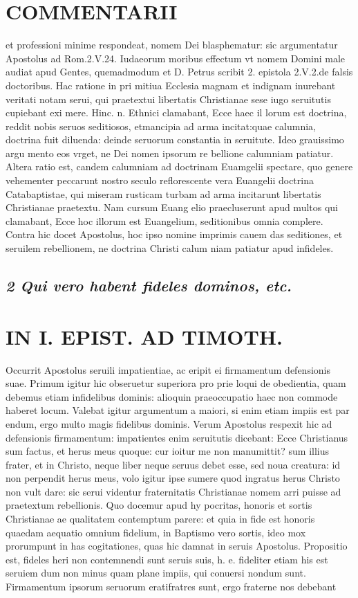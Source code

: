 \documentclass{article}
\begin{document}
\begin{pages}
\section*{COMMENTARII }
\marginpar{[ p.146 ]}\pstart et professioni minime respondeat, nomem Dei blasphematur: sic argumentatur Apostolus ad Rom.2.V.24. Iudaeorum moribus effectum vt nomem Domini male audiat apud Gentes, quemadmodum et D. Petrus scribit 2. epistola 2.V.2.de falsis doctoribus. Hac ratione in pri mitiua Ecclesia magnam et indignam inurebant veritati notam serui, qui praetextui libertatis Christianae sese iugo seruitutis cupiebant exi mere. Hinc. n. Ethnici clamabant, Ecce haec il lorum est doctrina, reddit nobis seruos seditiosos, etmancipia ad arma incitat:quae calumnia, doctrina fuit diluenda: deinde seruorum constantia in seruitute. Ideo grauissimo argu mento eos vrget, ne Dei nomen ipsorum re bellione calumniam patiatur. Altera ratio est, candem calumniam ad doctrinam Euamgelii spectare, quo genere vehementer peccarunt nostro seculo reflorescente vera Euangelii doctrina Catabaptistae, qui miseram rusticam turbam ad arma incitarunt libertatis Christianae praetextu. Nam cursum Euang elio praecluserunt apud multos qui clamabant, Ecce hoc illorum est Euangelium, seditionibus omnia complere. Contra hic docet Apostolus, hoc ipso nomine imprimis cauem das seditiones, et seruilem rebellionem, ne doctrina Christi calum niam patiatur apud infideles.  \pend
{}
{}
\subsection*{\textit{2 Qui vero habent fideles dominos, etc. }}
\section*{IN I. EPIST. AD TIMOTH. }
\marginpar{[ p.147 ]}\pstart Occurrit Apostolus seruili impatientiae, ac eripit ei firmamentum defensionis suae. Primum igitur hic obseruetur superiora pro prie loqui de obedientia, quam debemus etiam infidelibus dominis: alioquin praeoccupatio haec non commode haberet locum. Valebat igitur argumentum a maiori, si enim etiam impiis est par endum, ergo multo magis fidelibus dominis. Verum Apostolus respexit hic ad defensionis firmamentum: impatientes enim seruitutis dicebant: Ecce Christianus sum factus, et herus meus quoque: cur ioitur me non manumittit? sum illius frater, et in Christo, neque liber neque seruus debet esse, sed noua creatura: id non perpendit herus meus, volo igitur ipse sumere quod ingratus herus Christo non vult dare: sic serui videntur fraternitatis Christianae nomem arri puisse ad praetextum rebellionis. Quo docemur apud hy pocritas, honoris et sortis Christianae ae qualitatem contemptum parere: et quia in fide est honoris quaedam aequatio omnium fidelium, in Baptismo vero sortis, ideo mox prorumpunt in has cogitationes, quas hic damnat in seruis Apostolus. Propositio est, fideles heri non contemnendi sunt seruis suis, h. e. fideliter etiam his est seruiem dum non minus quam plane impiis, qui conuersi  \pend\pstart nondum sunt. Firmamentum ipsorum seruorum eratifratres sunt, ergo fraterne nos debebant  \pend

\end{pages}
\end{document}
